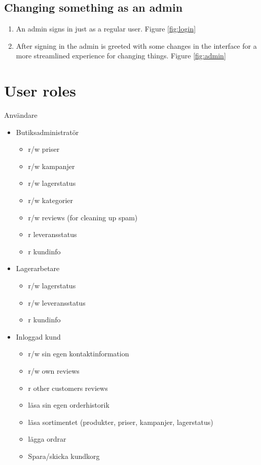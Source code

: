 \documentclass[paper=a4, fontsize=11pt]{report} %
\begin{document}
	\subsection*{Changing something as an admin}
	\begin{enumerate}
		\item An admin signs in just as a regular user. Figure \ref{fig:login}
		\item After signing in the admin is greeted with some changes in the interface for a more streamlined experience for changing things. Figure \ref{fig:admin}
	\end{enumerate}



\section*{User roles}

%

Användare
\begin{itemize}
	\item Butiksadministratör
	\begin{itemize}
		\item r/w priser
		\item r/w kampanjer
		\item r/w lagerstatus
		\item r/w kategorier
		\item r/w reviews (for cleaning up spam)
		\item r leveransstatus
		\item r kundinfo
	\end{itemize}
	\item Lagerarbetare
	\begin{itemize}
		\item r/w lagerstatus
		\item r/w leveransstatus
		\item r kundinfo
	\end{itemize}
	\item Inloggad kund
	\begin{itemize}
		\item r/w sin egen kontaktinformation
		\item r/w own reviews
		\item r other customers reviews
		\item läsa sin egen orderhistorik
		\item läsa sortimentet (produkter, priser, kampanjer, lagerstatus)
		\item lägga ordrar
		\item Spara/skicka kundkorg
	\end{itemize}
\end{itemize}
\end{document}

